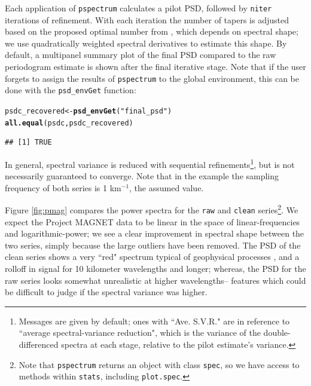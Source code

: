 \documentclass[10pt]{article}\usepackage{graphicx, color}
\makeatletter
\newcommand{\hlfunctioncall}[1]{\textcolor[rgb]{0.501960784313725,0,0.329411764705882}{\textbf{#1}}}%
\newcommand{\hlstring}[1]{\textcolor[rgb]{0.6,0.6,1}{#1}}%
\newenvironment{kframe}{%
 \def\at@end@of@kframe{}%
 \ifinner\ifhmode%
  \def\at@end@of@kframe{\end{minipage}}%
  \begin{minipage}{\columnwidth}%
 \fi\fi%
 \def\FrameCommand##1{\hskip\@totalleftmargin \hskip-\fboxsep
 \colorbox{shadecolor}{##1}\hskip-\fboxsep
     \hskip-\linewidth \hskip-\@totalleftmargin \hskip\columnwidth}%
 \MakeFramed {\advance\hsize-\width
   \@totalleftmargin\z@ \linewidth\hsize
   \@setminipage}}%
 {\par\unskip\endMakeFramed%
 \at@end@of@kframe}
\newenvironment{knitrout}{}{} %
\newcommand{\Rcmd}[1]{\texttt{#1}}
\makeatother
\begin{document}
Each application of \Rcmd{pspectrum} calculates a pilot PSD, followed by 
\Rcmd{niter}
iterations of refinement.
With each iteration
the number of tapers is adjusted 
based on the proposed optimal number from \citet{rs1995}, which
depends on spectral shape; we use 
quadratically weighted spectral derivatives \citep{prieto2007}
to estimate this shape.
By default, a multipanel summary plot of the final PSD compared
to the raw periodogram estimate is shown after the final iterative stage.
Note that if the user forgets to assign the results of
\Rcmd{pspectrum} to the global environment, this can be
done with the \Rcmd{psd\_envGet} function:
\begin{knitrout}
\color{fgcolor}\begin{kframe}
\begin{alltt}
psdc_recovered <- \hlfunctioncall{psd_envGet}(\hlstring{"final_psd"})
\hlfunctioncall{all.equal}(psdc, psdc_recovered)
\end{alltt}
\begin{verbatim}
## [1] TRUE
\end{verbatim}
\end{kframe}
\end{knitrout}


In general, spectral variance is reduced
with sequential refinements\footnote{
Messages are given by default; ones with
``Ave. S.V.R."
are in reference to 
 ``average spectral-variance reduction", which
 is the variance of the
 double-differenced spectra at each stage, relative
 to the pilot estimate's variance.
}, but is not necessarily guaranteed to converge.
Note that in the example
the sampling frequency of both series
is 1 km$^{-1}$, the assumed value.

Figure \ref{fig:pmag} compares the 
power spectra for the \Rcmd{raw} and \Rcmd{clean} 
series\footnote{
Note that \Rcmd{pspectrum} returns
an object with class \Rcmd{spec}, so we have access to methods 
within \Rcmd{stats}, including \Rcmd{plot.spec}.
}.  
We expect the Project MAGNET data to be linear in the space of
linear-frequencies and logarithmic-power;
we see a clear
improvement in spectral shape between the two series,
simply because the large outliers have been removed.
The PSD of the clean series shows a
very ``red" spectrum typical of geophysical processes \citep{agnew1992},
and a rolloff in signal
for 10 kilometer wavelengths and longer; whereas, the 
PSD for the raw series looks somewhat unrealistic at higher wavelengths--
features which could be difficult to judge if the spectral variance was higher.
\end{document}
